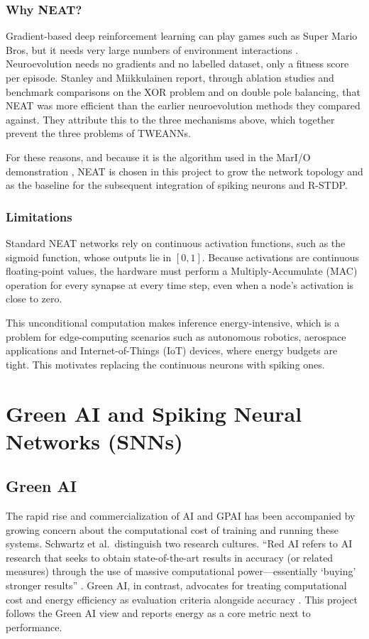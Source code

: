 \subsubsection{Why NEAT?}
Gradient-based deep reinforcement learning can play games such as Super Mario Bros, but it needs very large numbers of environment interactions \cite{mnih2015human}. Neuroevolution needs no gradients and no labelled dataset, only a fitness score per episode. Stanley and Miikkulainen \cite{stanley2002} report, through ablation studies and benchmark comparisons on the XOR problem and on double pole balancing, that NEAT was more efficient than the earlier neuroevolution methods they compared against. They attribute this to the three mechanisms above, which together prevent the three problems of TWEANNs.

For these reasons, and because it is the algorithm used in the MarI/O demonstration \cite{sethbling2015mario}, NEAT is chosen in this project to grow the network topology and as the baseline for the subsequent integration of spiking neurons and R-STDP.

\subsubsection{Limitations}
Standard NEAT networks rely on continuous activation functions, such as the sigmoid function, whose outputs lie in $[0, 1]$. Because activations are continuous floating-point values, the hardware must perform a Multiply-Accumulate (MAC) operation for every synapse at every time step, even when a node's activation is close to zero.

This unconditional computation makes inference energy-intensive, which is a problem for edge-computing scenarios such as autonomous robotics, aerospace applications and Internet-of-Things (IoT) devices, where energy budgets are tight. This motivates replacing the continuous neurons with spiking ones.

\section{Green AI and Spiking Neural Networks (SNNs)}

\subsection{Green AI}

The rapid rise and commercialization of AI and GPAI has been accompanied by growing concern about the computational cost of training and running these systems. Schwartz et al.\ distinguish two research cultures. ``Red AI refers to AI research that seeks to obtain state-of-the-art results in accuracy (or related measures) through the use of massive computational power---essentially `buying' stronger results'' \cite{schwartz2020green}. Green AI, in contrast, advocates for treating computational cost and energy efficiency as evaluation criteria alongside accuracy \cite{schwartz2020green}. This project follows the Green AI view and reports energy as a core metric next to performance.

